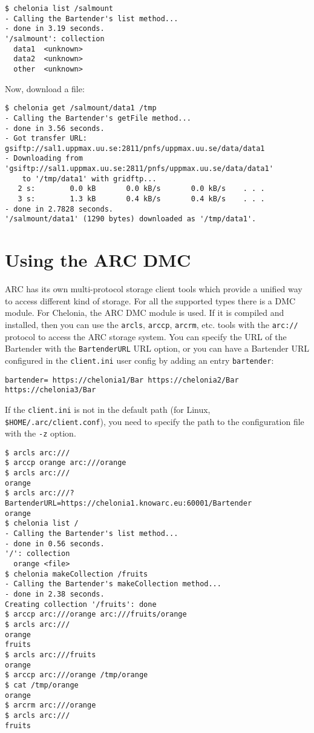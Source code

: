 \documentclass{article}
\begin{document}
\begin{verbatim}
$ chelonia list /salmount
- Calling the Bartender's list method...
- done in 3.19 seconds.
'/salmount': collection
  data1  <unknown>
  data2  <unknown>
  other  <unknown>
\end{verbatim}

Now, download a file:

\begin{verbatim}
$ chelonia get /salmount/data1 /tmp
- Calling the Bartender's getFile method...
- done in 3.56 seconds.
- Got transfer URL: gsiftp://sal1.uppmax.uu.se:2811/pnfs/uppmax.uu.se/data/data1
- Downloading from 'gsiftp://sal1.uppmax.uu.se:2811/pnfs/uppmax.uu.se/data/data1'
    to '/tmp/data1' with gridftp...
   2 s:        0.0 kB       0.0 kB/s       0.0 kB/s    . . .       
   3 s:        1.3 kB       0.4 kB/s       0.4 kB/s    . . .       
- done in 2.7828 seconds.
'/salmount/data1' (1290 bytes) downloaded as '/tmp/data1'.
\end{verbatim}

\section{Using the ARC DMC} %
\label{sec:using_the_arc_dmc}

ARC has its own multi-protocol storage client tools which provide a
unified way to access different kind of storage. For all the supported
types there is a DMC module. For Chelonia, the ARC DMC module is
used. If it is compiled and installed, then you can use the
\verb!arcls!, \verb!arccp!, \verb!arcrm!, etc. tools with the
\verb!arc://! protocol to access the ARC storage system. You can
specify the URL of the Bartender with the \verb!BartenderURL! URL
option, or you can have a Bartender URL configured in the
\verb!client.ini! user config by adding an entry \verb!bartender!:

\begin{verbatim}
bartender= https://chelonia1/Bar https://chelonia2/Bar https://chelonia3/Bar
\end{verbatim}

If the \verb!client.ini! is not in the default path (for Linux,
\verb!$HOME/.arc/client.conf!), you need to specify the path to the
configuration file with the \verb!-z! option.


\begin{verbatim}
$ arcls arc:///
$ arccp orange arc:///orange
$ arcls arc:///
orange
$ arcls arc:///?BartenderURL=https://chelonia1.knowarc.eu:60001/Bartender
orange
$ chelonia list /
- Calling the Bartender's list method...
- done in 0.56 seconds.
'/': collection
  orange <file>
$ chelonia makeCollection /fruits
- Calling the Bartender's makeCollection method...
- done in 2.38 seconds.
Creating collection '/fruits': done
$ arccp arc:///orange arc:///fruits/orange
$ arcls arc:///
orange
fruits
$ arcls arc:///fruits
orange
$ arccp arc:///orange /tmp/orange
$ cat /tmp/orange 
orange
$ arcrm arc:///orange
$ arcls arc:///
fruits
\end{verbatim}
\end{document}
